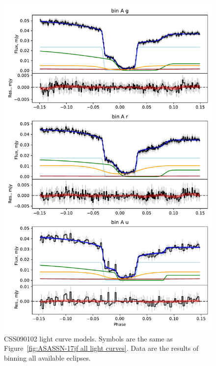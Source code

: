 \begin{figure}
    \centering
    \includegraphics[width=\textwidth]{figures/results/CSS090102/CSS090102_1.pdf}
    \caption{CSS090102 light curve models. Symbols are the same as Figure~\ref{fig:ASASSN-17jf all light curves}. Data are the results of binning all available eclipses.}
    \label{fig:CSS090102 all light curves}
\end{figure}
